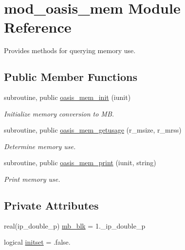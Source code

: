 \hypertarget{classmod__oasis__mem}{\section{mod\+\_\+oasis\+\_\+mem Module Reference}
\label{classmod__oasis__mem}
}


Provides methods for querying memory use.  


\subsection*{Public Member Functions}
\begin{DoxyCompactItemize}
\item 
subroutine, public \hyperlink{classmod__oasis__mem_a104b7e7e85cd79e731a6e12a14358bbb}{oasis\+\_\+mem\+\_\+init} (iunit)
\begin{DoxyCompactList}\small\item\em Initialize memory conversion to M\+B. \end{DoxyCompactList}\item 
subroutine, public \hyperlink{classmod__oasis__mem_a2e20a40b48c7a7572f72da1b5d109ce3}{oasis\+\_\+mem\+\_\+getusage} (r\+\_\+msize, r\+\_\+mrss)
\begin{DoxyCompactList}\small\item\em Determine memory use. \end{DoxyCompactList}\item 
subroutine, public \hyperlink{classmod__oasis__mem_ac628b504553edbe9345cd070a8db2634}{oasis\+\_\+mem\+\_\+print} (iunit, string)
\begin{DoxyCompactList}\small\item\em Print memory use. \end{DoxyCompactList}\end{DoxyCompactItemize}
\subsection*{Private Attributes}
\begin{DoxyCompactItemize}
\item 
real(ip\+\_\+double\+\_\+p) \hyperlink{classmod__oasis__mem_a7c262f1c120ed57d527ee3de91552ee9}{mb\+\_\+blk} = 1.\+\_\+ip\+\_\+double\+\_\+p
\item 
logical \hyperlink{classmod__oasis__mem_aad83c95e1a17a31825eb9c4e1c663aa1}{initset} = .false.
\end{DoxyCompactItemize}


